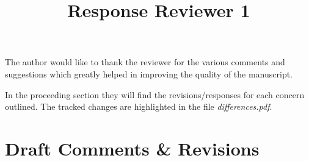 \documentclass{article}
\begin{document}
\title{Response Reviewer 1}
\maketitle

The author would like to thank the reviewer for the various comments
and suggestions which greatly helped in improving the quality of the manuscript. 

In the proceeding section they will find the revisions/responses for
each concern outlined. The tracked changes are highlighted in the file \emph{differences.pdf}.

\section*{Draft Comments \& Revisions}
\end{document}
